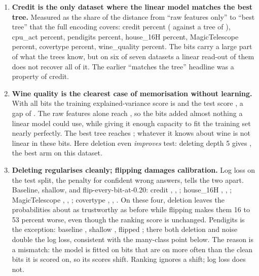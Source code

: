 \documentclass[11pt,a4paper]{article}
\newcommand{\num}[1]{\texttt{#1}}
\begin{document}
\begin{enumerate}
\item \textbf{Credit is the only dataset where the linear model matches the
best tree.} Measured as the share of the distance from ``raw features only'' to
``best tree'' that the full encoding covers: credit \creditClosed{} percent
(\num{\creditBaseTest} against a tree of \num{\creditTree}), cpu\_act
\cpuactClosed{} percent, pendigits \pendigitsClosed{} percent, house\_16H
\houseSixteenHClosed{} percent, MagicTelescope \MagicTelescopeClosed{}
percent, covertype \covertypeClosed{} percent, wine\_quality
\winequalityClosed{} percent. The bits carry a large part of what the trees
know, but on six of seven datasets a linear read-out of them does not recover
all of it. The earlier ``matches the tree'' headline was a property of credit.

\item \textbf{Wine quality is the clearest case of memorisation without
learning.} With all bits the training explained-variance score is
\num{\winequalityBaseTrain} and the test score \num{\winequalityBaseTest}, a
gap of \num{\winequalityBaseGap}. The raw features alone reach
\num{\winequalityRaw}, so the \num{\winequalityBits} bits added almost nothing
a linear model could use, while giving it enough capacity to fit the training
set nearly perfectly. The best tree reaches \num{\winequalityTree}; whatever it
knows about wine is not linear in these bits. Here deletion even
\emph{improves} test: deleting depth 5 gives \num{\winequalityDropFiveTest},
the best arm on this dataset.

\item \textbf{Deleting regularises cleanly; flipping damages calibration.}
Log loss on the test split, the penalty for confident wrong answers, tells the
two apart. Baseline, shallow, and flip-every-bit-at-0.20: credit
\num{\creditBaseLL}, \num{\creditKeepLL}, \num{\creditUnifLL}; house\_16H
\num{\houseSixteenHBaseLL}, \num{\houseSixteenHKeepLL},
\num{\houseSixteenHUnifLL}; MagicTelescope \num{\MagicTelescopeBaseLL},
\num{\MagicTelescopeKeepLL}, \num{\MagicTelescopeUnifLL}; covertype
\num{\covertypeBaseLL}, \num{\covertypeKeepLL}, \num{\covertypeUnifLL}.
On these four, deletion leaves the probabilities about as trustworthy as
before while flipping makes them 16 to 53 percent worse, even though the
ranking score is unchanged. Pendigits is the exception: baseline
\num{\pendigitsBaseLL}, shallow \num{\pendigitsKeepLL}, flipped
\num{\pendigitsUnifLL}; there both deletion and noise double the log loss,
consistent with the many-class point below. The reason is a mismatch: the model is fitted on bits that are on
more often than the clean bits it is scored on, so its scores shift. Ranking
ignores a shift; log loss does not.


\end{enumerate}
\end{document}
